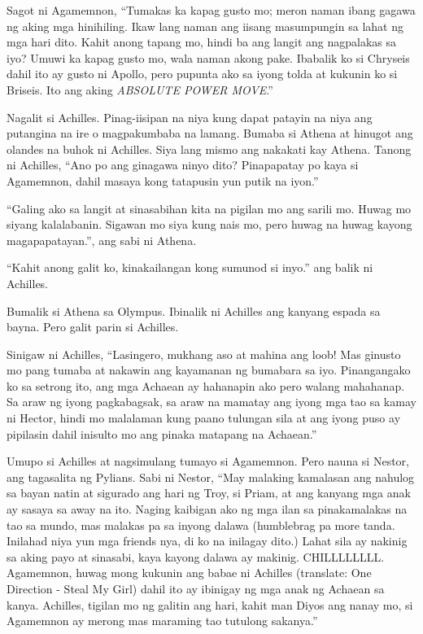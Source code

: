 \documentclass[12pt,letterpaper]{report}
\begin{document}
Sagot ni Agamemnon, ``Tumakas ka kapag gusto mo; meron naman ibang gagawa ng aking mga hinihiling. Ikaw lang naman ang iisang masumpungin sa lahat ng mga hari dito. Kahit anong tapang mo, hindi ba ang langit ang nagpalakas sa iyo? Umuwi ka kapag gusto mo, wala naman akong pake. Ibabalik ko si Chryseis dahil ito ay gusto ni Apollo, pero pupunta ako sa iyong tolda at kukunin ko si Briseis. Ito ang aking \textit{ABSOLUTE POWER MOVE}.''

Nagalit si Achilles. Pinag-iisipan na niya kung dapat patayin na niya ang putangina na ire o magpakumbaba na lamang. Bumaba si Athena at hinugot ang olandes na buhok ni Achilles. Siya lang mismo ang nakakati kay Athena. Tanong ni Achilles, ``Ano po ang ginagawa ninyo dito? Pinapapatay po kaya si Agamemnon, dahil masaya kong tatapusin yun putik na iyon.''

``Galing ako sa langit at sinasabihan kita na pigilan mo ang sarili mo. Huwag mo siyang kalalabanin. Sigawan mo siya kung nais mo, pero huwag na huwag kayong magapapatayan.'', ang sabi ni Athena.

``Kahit anong galit ko, kinakailangan kong sumunod si inyo.'' ang balik ni Achilles.

Bumalik si Athena sa Olympus. Ibinalik ni Achilles ang kanyang espada sa bayna. Pero galit parin si Achilles.

Sinigaw ni Achilles, ``Lasingero, mukhang aso at mahina ang loob! Mas ginusto mo pang tumaba at nakawin ang kayamanan ng bumabara sa iyo. Pinangangako ko sa setrong ito, ang mga Achaean ay hahanapin ako pero walang mahahanap. Sa araw ng iyong pagkabagsak, sa araw na mamatay ang iyong mga tao sa kamay ni Hector, hindi mo malalaman kung paano tulungan sila at ang iyong puso ay pipilasin dahil inisulto mo ang pinaka matapang na Achaean.''

Umupo si Achilles at nagsimulang tumayo si Agamemnon. Pero nauna si Nestor, ang tagasalita ng Pylians. Sabi ni Nestor, ``May malaking kamalasan ang nahulog sa bayan natin at sigurado ang hari ng Troy, si Priam, at ang kanyang mga anak ay sasaya sa away na ito. Naging kaibigan ako ng mga ilan sa pinakamalakas na tao sa mundo, mas malakas pa sa inyong dalawa (humblebrag pa more tanda. Inilahad niya yun mga friends nya, di ko na inilagay dito.) Lahat sila ay nakinig sa aking payo at sinasabi, kaya kayong dalawa ay makinig. CHILLLLLLLL. Agamemnon, huwag mong kukunin ang babae ni Achilles (translate: One Direction - Steal My Girl) dahil ito ay ibinigay ng mga anak ng Achaean sa kanya. Achilles, tigilan mo ng galitin ang hari, kahit man Diyos ang nanay mo, si Agamemnon ay merong mas maraming tao tutulong sakanya.''
\end{document}
